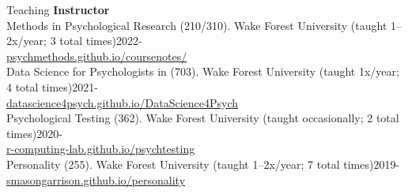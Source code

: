 \begin{rSection}{\textrm{Teaching}}
\vspace*{2pt}
{\large  \bf Instructor}\\
Methods in Psychological Research (210/310). Wake Forest University \hfill{(taught 1--2x/year; 3 total times)}\hfill{2022-}\\
\hspace*{6 mm} \href{https://psychmethods.github.io/coursenotes/}{\color{blue} psychmethods.github.io/coursenotes/}\smallskip\\
Data Science for Psychologists in \R (703). Wake Forest University \hfill{(taught 1x/year; 4 total times)}\hfill{2021-}\\
\hspace*{6 mm} \href{https://datascience4psych.github.io/DataScience4Psych/}{\color{blue} datascience4psych.github.io/DataScience4Psych}\smallskip\\

Psychological Testing (362). Wake Forest University \hfill{(taught occasionally; 2 total times)}\hfill{2020-}\\
\hspace*{6 mm} \href{https://r-computing-lab.github.io/psychtesting/}{\color{blue} r-computing-lab.github.io/psychtesting}\smallskip\\

Personality (255). Wake Forest University \hfill{(taught 1--2x/year; 7 total times)}\hfill{2019-}\\
\hspace*{6 mm} \href{https://smasongarrison.github.io/personality/}{\color{blue} smasongarrison.github.io/personality} \\


\end{rSection}
